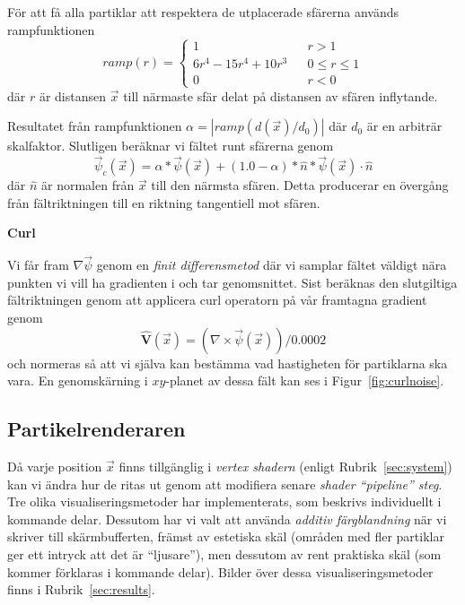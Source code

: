 \documentclass[a4paper]{article}
\begin{document}
\begin{multicols}{2}
För att få alla partiklar att respektera de utplacerade sfärerna används rampfunktionen
\begin{equation}
ramp(r) = \left\{\begin{matrix}
1  && r > 1
\\
6r^4 - 15r^4 + 10r^3 && 0 \le r \le 1
\\ 
0  && r < 0
\end{matrix}\right.
\end{equation}
där $r$ är distansen $\vec{x}$ till närmaste sfär delat på distansen av sfären inflytande. 

Resultatet från rampfunktionen $\alpha = | ramp(d(\vec{x})/d_0) |$ där $d_0$  är en arbiträr skalfaktor. Slutligen beräknar vi fältet runt sfärerna genom 
\begin{equation}
\vec{\psi}_c(\vec{x}) = \alpha * \vec{\psi}(\vec{x}) + (1.0 - \alpha) * \hat{n} * \vec{\psi}(\vec{x}) \cdot \hat{n}
\end{equation}
där $\hat{n}$ är normalen från $\vec{x}$ till den närmsta sfären. Detta producerar en övergång från fältriktningen till en riktning tangentiell mot sfären.

\textbf{Curl}

Vi får fram $ \nabla \vec{\psi}$ genom en \textit{finit differensmetod} där vi samplar fältet väldigt nära punkten vi vill ha gradienten i och tar genomsnittet. Sist beräknas den slutgiltiga fältriktningen genom att applicera curl operatorn på vår framtagna gradient genom
\begin{equation}
\mathbf{\hat{V}}(\vec{x}) =
(\nabla \times \vec{\psi}(\vec{x})) / 0.0002
\end{equation}
och normeras så att vi själva kan bestämma vad hastigheten för partiklarna ska vara. En genomskärning i $xy$-planet av dessa fält kan ses i Figur~\ref{fig:curlnoise}. 

\subsection{Partikelrenderaren} \label{sec:partikelrenderaren}

Då varje position \(\vec{x}\) finns tillgänglig i \emph{vertex shadern} (enligt Rubrik~\ref{sec:system}) kan vi ändra hur de ritas ut genom att modifiera senare \emph{shader ``pipeline'' steg}. Tre olika visualiseringsmetoder har implementerats, som beskrivs individuellt i kommande delar. Dessutom har vi valt att använda \emph{additiv färgblandning} när vi skriver till skärmbufferten, främst av estetiska skäl (områden med fler partiklar ger ett intryck att det är ``ljusare''), men dessutom av rent praktiska skäl (som kommer förklaras i kommande delar). Bilder över dessa visualiseringsmetoder finns i Rubrik~\ref{sec:results}.


\end{multicols}
\end{document}
